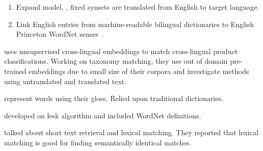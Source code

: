 \begin{enumerate}
    \item Expand model, \textcite{vossen_introduction_1998}, fixed synsets are translated from English to target language.
    \item Link English entries from machine-readable bilingual dictionaries to English Princeton WordNet senses~\textcite{knight_building_1994}.
\end{enumerate}

\textcite{gordeev_unsupervised_2018} uses unsupervised cross-lingual embeddings to match cross-lingual product classifications.
Working on taxonomy matching, they use out of domain pre-trained embeddings due to small size of their corpora and investigate methods using untranslated and translated text.

\textcite{lesk_automatic_1986} represent words using their gloss.
Relied upon traditional dictionaries.

\textcite{banerjee_adapted_2002} developed on lesk algorithm and included WordNet definitions.

\textcite{metzler_similarity_2007} talked about short text retrieval and lexical matching.
They reported that lexical matching is good for finding semantically identical matches.

